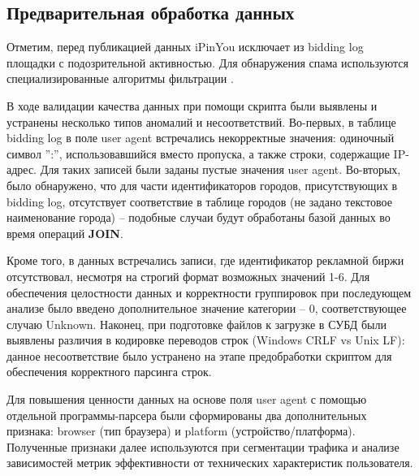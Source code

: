 \subsection{Предварительная обработка данных}

Отметим, перед публикацией данных iPinYou исключает из bidding log площадки с подозрительной активностью. Для обнаружения спама используются специализированные алгоритмы фильтрации \cite{ipinyou-contest-database}.

В ходе валидации качества данных при помощи скрипта были выявлены и устранены несколько типов аномалий и несоответствий. Во-первых, в таблице bidding log в поле user agent встречались некорректные значения: одиночный символ '':'', использовавшийся вместо пропуска, а также строки, содержащие IP-адрес. Для таких записей были заданы пустые значения user agent. Во-вторых, было обнаружено, что для части идентификаторов городов, присутствующих в bidding log, отсутствует соответствие в таблице городов (не задано текстовое наименование города) -- подобные случаи будут обработаны базой данных во время операций \textbf{JOIN}.

Кроме того, в данных встречались записи, где идентификатор рекламной биржи отсутствовал, несмотря на строгий формат возможных значений 1-6. Для обеспечения целостности данных и корректности группировок при последующем анализе было введено дополнительное значение категории -- 0, соответствующее случаю Unknown. Наконец, при подготовке файлов к загрузке в СУБД были выявлены различия в кодировке переводов строк (Windows CRLF vs Unix LF): данное несоответствие было устранено на этапе предобработки скриптом для обеспечения корректного парсинга строк.

Для повышения ценности данных на основе поля user agent с помощью отдельной программы-парсера были сформированы два дополнительных признака: browser (тип браузера) и platform (устройство/платформа). Полученные признаки далее используются при сегментации трафика и анализе зависимостей метрик эффективности от технических характеристик пользователя.

